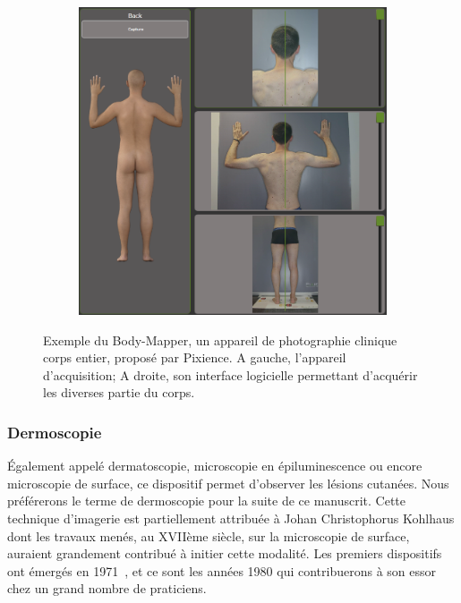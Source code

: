 \begin{figure}[H]
\begin{subfigure}{.28\textwidth}
    \end{subfigure}
    \begin{subfigure}{.65\textwidth}
      \centering
      \includegraphics[width=\linewidth]{contents/chapter_2/resources/example_device_bodymapper_2.png}
    \end{subfigure}
    \caption{Exemple du Body-Mapper, un appareil de photographie clinique corps entier, proposé par Pixience. A gauche, l'appareil d'acquisition; A droite, son interface logicielle permettant d'acquérir les diverses partie du corps.}
    \label{fig:example_device_bodymapper}
\end{figure}\par


\subsubsection{Dermoscopie}
Également appelé dermatoscopie, microscopie en épiluminescence ou encore microscopie de surface, ce dispositif permet d’observer les lésions cutanées. Nous préférerons le terme de dermoscopie pour la suite de ce manuscrit. Cette technique d’imagerie est partiellement attribuée à Johan Christophorus Kohlhaus dont les travaux menés, au XVIIème siècle, sur la microscopie de surface, auraient grandement contribué à initier cette modalité. Les premiers dispositifs ont émergés en 1971~\cite{MacKie1972}, et ce sont les années 1980 qui contribuerons à son essor chez un grand nombre de praticiens.\par

